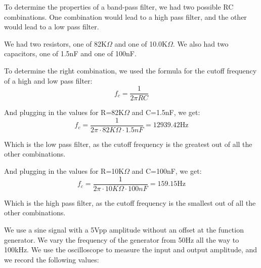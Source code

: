 To determine the properties of a band-pass filter, we had two possible RC combinations.
One combination would lead to a high pass filter, and the other would lead to a low pass filter.

We had two resistors, one of 82K$\Omega$ and one of 10.0K$\Omega$. We also had two capacitors, one of 1.5nF and one of 100nF.

To determine the right combination, we used the formula for the cutoff frequency of a high and low pass filter:
\begin{equation}
    f_c = \frac{1}{2\pi RC}
\end{equation}

And plugging in the values for R=82K$\Omega$ and C=1.5nF, we get:
\begin{equation}
    f_c = \frac{1}{2\pi \cdot 82K\Omega \cdot 1.5nF} = 12939.42\text{Hz}
\end{equation}

Which is the low pass filter, as the cutoff frequency is the greatest out of all the other combinations.


And plugging in the values for R=10K$\Omega$ and C=100nF, we get:
\begin{equation}
    f_c = \frac{1}{2\pi \cdot 10K\Omega \cdot 100nF} = 159.15\text{Hz}
\end{equation}

Which is the high pass filter, as the cutoff frequency is the smallest out of all the other combinations.


We use a sine signal with a 5Vpp amplitude without an offset at the function generator. We vary the frequency of the generator from 50Hz all the way to 100kHz.
We use the oscilloscope to measure the input and output amplitude, and we record the following values:

